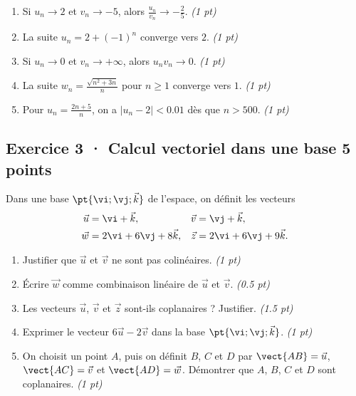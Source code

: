 \begin{enumerate}

\item Si $u_n\to 2$ et $v_n\to-5$, alors $\frac{u_n}{v_n}\to-\frac{2}{5}$. \hfill\textit{(1 pt)}

\item La suite $u_n=2+(-1)^n$ converge vers $2$. \hfill\textit{(1 pt)}

\item Si $u_n\to0$ et $v_n\to+\infty$, alors $u_nv_n\to0$. \hfill\textit{(1 pt)}

\item La suite $w_n=\frac{\sqrt{n^2+3n}}{n}$ pour $n\ge1$ converge vers $1$. \hfill\textit{(1 pt)}

\item Pour $u_n=\frac{2n+5}{n}$, on a $|u_n-2|<\num{0,01}$ dès que $n> 500$. \hfill\textit{(1 pt)}

\end{enumerate}

\mxnewpage{}

\subsection*{Exercice 3 · Calcul vectoriel dans une base \hfill 5 points}Dans une base $\pt{\vi;\vj;\vec k}$ de l'espace, on définit les vecteurs
\[\begin{aligned}\vec u&=\vi+\vec k,&\vec v&=\vj+\vec k,\\
\vec w&=2\vi+6\vj+8\vec k,&\vec z&=2\vi+6\vj+9\vec k.\end{aligned}\]

\begin{enumerate}

\item Justifier que $\vec u$ et $\vec v$ ne sont pas colinéaires. \hfill\textit{(1 pt)}

\item Écrire $\vec w$ comme combinaison linéaire de $\vec u$ et $\vec v$. \hfill\textit{(\num{0,5} pt)}

\item Les vecteurs $\vec u$, $\vec v$ et $\vec z$ sont-ils coplanaires ? Justifier. \hfill\textit{(\num{1,5} pt)}

\item Exprimer le vecteur $6\vec u-2\vec v$ dans la base $\pt{\vi;\vj;\vec k}$. \hfill\textit{(1 pt)}

\item On choisit un point $A$, puis on définit $B$, $C$ et $D$ par $\vect{AB}=\vec u$, $\vect{AC}=\vec v$ et $\vect{AD}=\vec w$. Démontrer que $A$, $B$, $C$ et $D$ sont coplanaires. \hfill\textit{(1 pt)}

\end{enumerate}

